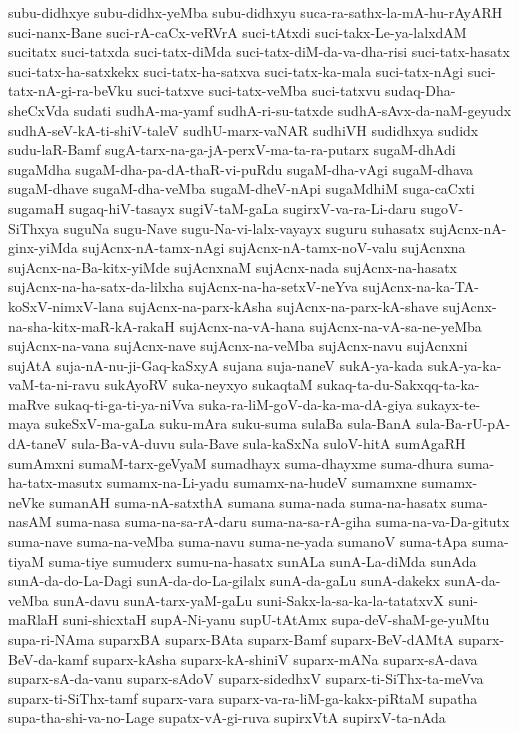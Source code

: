 {subu-didhxye
subu-didhx-yeMba
subu-didhxyu
suca-ra-sathx-la-mA-hu-rAyARH
suci-nanx-Bane
suci-rA-caCx-veRVrA
suci-tAtxdi
suci-takx-Le-ya-lalxdAM
sucitatx
suci-tatxda
suci-tatx-diMda
suci-tatx-diM-da-va-dha-risi
suci-tatx-hasatx
suci-tatx-ha-satxkekx
suci-tatx-ha-satxva
suci-tatx-ka-mala
suci-tatx-nAgi
suci-tatx-nA-gi-ra-beVku
suci-tatxve
suci-tatx-veMba
suci-tatxvu
sudaq-Dha-sheCxVda
sudati
sudhA-ma-yamf
sudhA-ri-su-tatxde
sudhA-sAvx-da-naM-geyudx
sudhA-seV-kA-ti-shiV-taleV
sudhU-marx-vaNAR
sudhiVH
sudidhxya
sudidx
sudu-laR-Bamf
sugA-tarx-na-ga-jA-perxV-ma-ta-ra-putarx
sugaM-dhAdi
sugaMdha
sugaM-dha-pa-dA-thaR-vi-puRdu
sugaM-dha-vAgi
sugaM-dhava
sugaM-dhave
sugaM-dha-veMba
sugaM-dheV-nApi
sugaMdhiM
suga-caCxti
sugamaH
sugaq-hiV-tasayx
sugiV-taM-gaLa
sugirxV-va-ra-Li-daru
sugoV-SiThxya
suguNa
sugu-Nave
sugu-Na-vi-lalx-vayayx
suguru
suhasatx
sujAcnx-nA-ginx-yiMda
sujAcnx-nA-tamx-nAgi
sujAcnx-nA-tamx-noV-valu
sujAcnxna
sujAcnx-na-Ba-kitx-yiMde
sujAcnxnaM
sujAcnx-nada
sujAcnx-na-hasatx
sujAcnx-na-ha-satx-da-lilxha
sujAcnx-na-ha-setxV-neYva
sujAcnx-na-ka-TA-koSxV-nimxV-lana
sujAcnx-na-parx-kAsha
sujAcnx-na-parx-kA-shave
sujAcnx-na-sha-kitx-maR-kA-rakaH
sujAcnx-na-vA-hana
sujAcnx-na-vA-sa-ne-yeMba
sujAcnx-na-vana
sujAcnx-nave
sujAcnx-na-veMba
sujAcnx-navu
sujAcnxni
sujAtA
suja-nA-nu-ji-Gaq-kaSxyA
sujana
suja-naneV
sukA-ya-kada
sukA-ya-ka-vaM-ta-ni-ravu
sukAyoRV
suka-neyxyo
sukaqtaM
sukaq-ta-du-Sakxqq-ta-ka-maRve
sukaq-ti-ga-ti-ya-niVva
suka-ra-liM-goV-da-ka-ma-dA-giya
sukayx-te-maya
sukeSxV-ma-gaLa
suku-mAra
suku-suma
sulaBa
sula-BanA
sula-Ba-rU-pA-dA-taneV
sula-Ba-vA-duvu
sula-Bave
sula-kaSxNa
suloV-hitA
sumAgaRH
sumAmxni
sumaM-tarx-geVyaM
sumadhayx
suma-dhayxme
suma-dhura
suma-ha-tatx-masutx
sumamx-na-Li-yadu
sumamx-na-hudeV
sumamxne
sumamx-neVke
sumanAH
suma-nA-satxthA
sumana
suma-nada
suma-na-hasatx
suma-nasAM
suma-nasa
suma-na-sa-rA-daru
suma-na-sa-rA-giha
suma-na-va-Da-gitutx
suma-nave
suma-na-veMba
suma-navu
suma-ne-yada
sumanoV
suma-tApa
suma-tiyaM
suma-tiye
sumuderx
sumu-na-hasatx
sunALa
sunA-La-diMda
sunAda
sunA-da-do-La-Dagi
sunA-da-do-La-gilalx
sunA-da-gaLu
sunA-dakekx
sunA-da-veMba
sunA-davu
sunA-tarx-yaM-gaLu
suni-Sakx-la-sa-ka-la-tatatxvX
suni-maRlaH
suni-shicxtaH
supA-Ni-yanu
supU-tAtAmx
supa-deV-shaM-ge-yuMtu
supa-ri-NAma
suparxBA
suparx-BAta
suparx-Bamf
suparx-BeV-dAMtA
suparx-BeV-da-kamf
suparx-kAsha
suparx-kA-shiniV
suparx-mANa
suparx-sA-dava
suparx-sA-da-vanu
suparx-sAdoV
suparx-sidedhxV
suparx-ti-SiThx-ta-meVva
suparx-ti-SiThx-tamf
suparx-vara
suparx-va-ra-liM-ga-kakx-piRtaM
supatha
supa-tha-shi-va-no-Lage
supatx-vA-gi-ruva
supirxVtA
supirxV-ta-nAda
}

